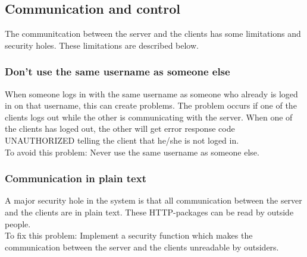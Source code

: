 \subsection{Communication and control}
The communitcation between the server and the clients has some limitations and security holes. These limitations are described below.

\subsubsection{Don't use the same username as someone else}
When someone logs in with the same username as someone who already is loged in on that username, this can create problems. The problem occurs if one of the clients logs out while the other is communicating with the server. When one of the clients has loged out, the other will get error response code UNAUTHORIZED telling the client that he/she is not loged in.
\\To avoid this problem: Never use the same username as someone else.
\subsubsection{Communication in plain text}
A major security hole in the system is that all communication between the server and the clients are in plain text. These HTTP-packages can be read by outside people.
\\To fix this problem: Implement a security function which makes the communication between the server and the clients unreadable by outsiders.
\subsubsection{}
